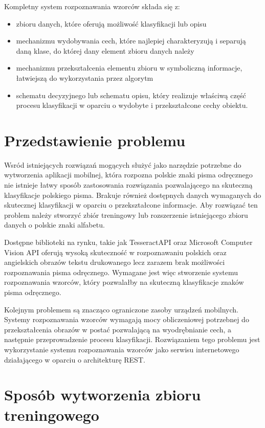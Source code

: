 \documentclass[brudnopis]{xmgr}
\begin{document}
Kompletny system rozpoznawania wzorców składa się z:
\begin{itemize}
\item
zbioru danych, które oferują możliwość klasyfikacji lub opisu
\item
mechanizmu wydobywania cech, które najlepiej charakteryzują i separują daną klase, do której dany element zbioru danych należy
\item
mechanizmu przekształcenia elementu zbioru w symboliczną informacje, łatwiejszą do wykorzystania przez algorytm
\item
schematu decyzyjnego lub schematu opisu, który realizuje właściwą część procesu klasyfikacji w oparciu o wydobyte i przekształcone cechy obiektu.
\end{itemize}

\section{Przedstawienie problemu}

Wsród istniejących rozwiązań mogących służyć jako narzędzie potrzebne do wytworzenia aplikacji mobilnej, która rozpozna polskie znaki pisma odręcznego nie istnieje łatwy sposób zastosowania rozwiązania pozwalającego na skuteczną klasyfikacje polskiego pisma. Brakuje również dostępnych danych wymaganych do skutecznej klasyfikacji w oparciu o przekształcone informacje. Aby rozwiązać ten problem należy stworzyć zbiór treningowy lub rozszerzenie istniejącego zbioru danych o polskie znaki alfabetu.

Dostępne biblioteki na rynku, takie jak TesseractAPI oraz Microsoft Computer Vision API oferują wysoką skuteczność w rozpoznawaniu polskich oraz angielskich obrazów tekstu drukowanego lecz zarazem brak możliwości rozpoznawania pisma odręcznego. Wymagane jest więc stworzenie systemu rozpoznawania wzorców, który pozwalałby na skuteczną klasyfikacje znaków pisma odręcznego.

Kolejnym problemem są znacząco ograniczone zasoby urządzeń mobilnych. Systemy rozpoznawania wzorców wymagają mocy obliczeniowej potrzebnej do przekształcenia obrazów w postać pozwalającą na wyodrębnianie cech, a następnie przeprowadzenie procesu klasyfikacji. Rozwiązaniem tego problemu jest wykorzystanie systemu rozpoznawania wzorców jako serwisu internetowego działającego w oparciu o architekturę REST.

\section{Sposób wytworzenia zbioru treningowego}
\end{document}
